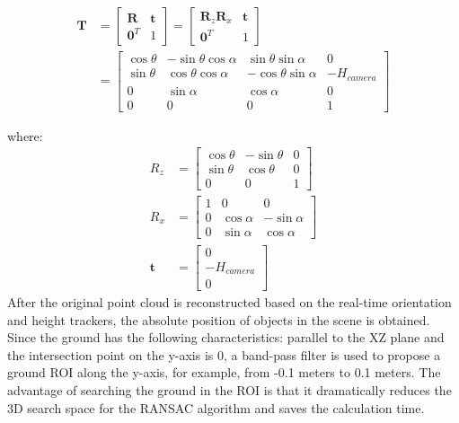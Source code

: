 \documentclass{ieeeaccess}
\begin{document}
\begin{equation}
\begin{aligned}
\textbf{T} &=
\begin{bmatrix}
  \textbf{R} & \textbf{t}\\ 
  \textbf{0}^T & 1
\end{bmatrix}
= 
\begin{bmatrix}
  \textbf{R}_z\textbf{R}_x & \textbf{t}\\ 
  \textbf{0}^T & 1
\end{bmatrix} 
\\
&=
\begin{bmatrix}
  \cos{\theta} & -\sin{\theta}\cos{\alpha} & \sin{\theta}\sin{\alpha} & 0\\ 
  \sin{\theta} & \cos{\theta}\cos{\alpha} & -\cos{\theta}\sin{\alpha} & -H_{camera} \\
  0 & \sin{\alpha} &\cos{\alpha}  & 0 \\
  0 & 0 & 0 & 1
\end{bmatrix}
\label{Equ:transform}
\end{aligned}
\end{equation}

where: 
\begin{equation}
\begin{aligned}
R_z&=
\begin{bmatrix}
   \cos{\theta} & -\sin{\theta} & 0 \\ 
  \sin{\theta} & \cos{\theta}   & 0\\
  0 & 0 &1
\end{bmatrix} \\
R_x&=
\begin{bmatrix}
   1& 0 & 0 \\ 
  0 & \cos{\alpha}   & -\sin{\alpha}\\
  0 & \sin{\alpha} & \cos{\alpha}
\end{bmatrix} \\
 \textbf{t} &= 
\begin{bmatrix}
 0\\ 
 -H_{camera}  \\
 0 
\end{bmatrix}
\label{Equ:roatation}
\end{aligned}
\end{equation}
After the original point cloud is reconstructed based on the real-time orientation and height trackers, the absolute position of objects in the scene is obtained. Since the ground has the following characteristics: parallel to the XZ plane and the intersection point on the y-axis is 0, a band-pass filter is used to propose a ground ROI along the y-axis, for example, from -0.1 meters to 0.1 meters. The advantage of searching the ground in the ROI is that it dramatically reduces the 3D search space for the RANSAC algorithm and saves the calculation time.
\end{document}

